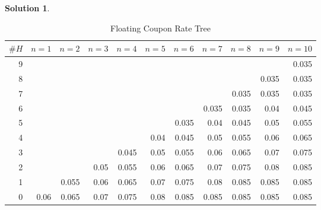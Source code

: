 \documentclass[a4paper, 10pt]{article}
\theoremstyle{definition}
\theoremstyle{hSol}
\newtheorem*{solution}{Solution}
\begin{document}
\begin{solution}
\begin{landscape}
\begin{table}[htbp]
  \centering
  \small
  \caption{Floating Coupon Rate Tree}
    \begin{tabular}{|r|rrrrrrrrrr|}
    \hline
    $\#H$    & $n=1$     & $n=2$     & $n=3$     & $n=4$     & $n=5$     & $n=6$     & $n=7$     & $n=8$     & $n=9$ & $n=10$     \\
    \hline
    9     &       &       &       &       &       &       &       &       &       & 0.035 \\
    8     &       &       &       &       &       &       &       &       & 0.035 & 0.035 \\
    7     &       &       &       &       &       &       &       & 0.035 & 0.035 & 0.035 \\
    6     &       &       &       &       &       &       & 0.035 & 0.035 & 0.04  & 0.045 \\
    5     &       &       &       &       &       & 0.035 & 0.04  & 0.045 & 0.05  & 0.055 \\
    4     &       &       &       &       & 0.04  & 0.045 & 0.05  & 0.055 & 0.06  & 0.065 \\
    3     &       &       &       & 0.045 & 0.05  & 0.055 & 0.06  & 0.065 & 0.07  & 0.075 \\
    2     &       &       & 0.05  & 0.055 & 0.06  & 0.065 & 0.07  & 0.075 & 0.08  & 0.085 \\
    1     &       & 0.055 & 0.06  & 0.065 & 0.07  & 0.075 & 0.08  & 0.085 & 0.085 & 0.085 \\
    0     & 0.06  & 0.065 & 0.07  & 0.075 & 0.08  & 0.085 & 0.085 & 0.085 & 0.085 & 0.085 \\
    \hline
    \end{tabular}%
  \label{tab:addlabel}%
\end{table}%



\end{landscape}
\end{solution}
\end{document}
